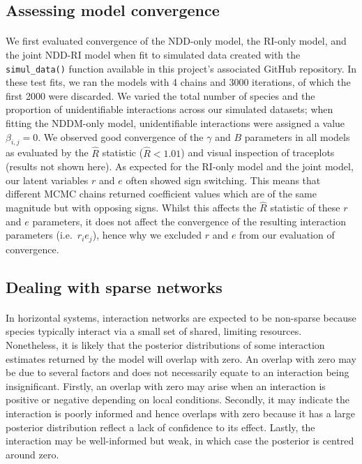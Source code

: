\documentclass[a4,12pt]{article}
\begin{document}
\begin{refsection}
    \subsection{Assessing model convergence}

        \paragraph{}
        We first evaluated convergence of the NDD-only model, the RI-only model, and the joint NDD-RI model when fit to simulated data created with the \texttt{simul\_data()} function available in this project's associated GitHub repository. In these test fits, we ran the models with 4 chains and 3000 iterations, of which the first 2000 were discarded. We varied the total number of species and the proportion of unidentifiable interactions across our simulated datasets; when fitting the NDDM-only model, unidentifiable interactions were assigned a value $\beta_{i,j} = 0$. We observed good convergence of the $\gamma$ and $B$ parameters in all models as evaluated by the $\hat{R}$ statistic ($\hat{R} < 1.01$) and visual inspection of traceplots (results not shown here).
        As expected for the RI-only model and the joint model, our latent variables $r$ and $e$ often showed sign switching. This means that different MCMC chains returned coefficient values which are of the same magnitude but with opposing signs. Whilst this affects the $\hat{R}$ statistic of these $r$ and $e$ parameters, it does not affect the convergence of the resulting interaction parameters (i.e.\ $r_i e_j$), hence why we excluded $r$ and $e$ from our evaluation of convergence.

    \subsection{Dealing with sparse networks}
    \label{meth:sparse}

        \paragraph{}
        In horizontal systems, interaction networks are expected to be non-sparse because species typically interact via a small set of shared, limiting resources. Nonetheless, it is likely that the posterior distributions of some interaction estimates returned by the model will overlap with zero. An overlap with zero may be due to several factors and does not necessarily equate to an interaction being insignificant. Firstly, an overlap with zero may arise when an interaction is positive or negative depending on local conditions. Secondly, it may indicate the interaction is poorly informed and hence overlaps with zero because it has a large posterior distribution reflect a lack of confidence to its effect. Lastly, the interaction may be well-informed but weak, in which case the posterior is centred around zero.


\end{refsection}
\end{document}
